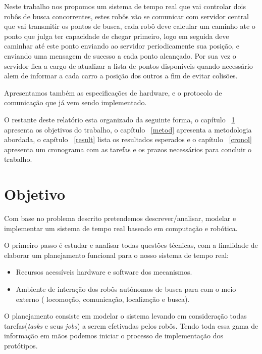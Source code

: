 \documentclass{abnt}
\begin{document}
    Neste trabalho nos propomos um sistema de tempo real que vai controlar
    dois robôs de busca concorrentes, estes robôs vão se comunicar com servidor
    central que vai transmitir os pontos de busca, cada robô deve calcular um
    caminho ate o ponto que julga ter capacidade de chegar primeiro, logo em
    seguida deve caminhar até este ponto enviando ao servidor periodicamente
    sua posição, e enviando uma mensagem de sucesso a cada ponto alcançado. Por
    sua vez o servidor fica a cargo de atualizar a lista de pontos disponíveis
    quando necessário alem de informar a cada carro a posição dos outros a fim
    de evitar colisões.

    Apresentamos também  as especificações de hardware, e o protocolo
    de comunicação que já vem sendo implementado.
     
    O restante deste relatório esta organizado da seguinte forma, o capítulo
    ~\ref{objt} apresenta os objetivos do trabalho, o capítulo ~\ref{metod}
    apresenta a metodologia abordada, o capítulo ~\ref{result} lista os
    resultados esperados e o capítulo ~\ref{cronol} apresenta um cronograma com
    as tarefas e os prazos necessários para concluir o trabalho.

\chapter{Objetivo} \label{objt}

Com base no problema descrito pretendemos descrever/analisar, modelar e
implementar  um sistema de tempo real baseado em computação e robótica. 

O primeiro passo é estudar e analisar todas questões técnicas, com a finalidade
de elaborar um planejamento funcional para o nosso sistema de tempo real:
\begin{itemize}

    \item Recursos acessíveis hardware e software dos mecanismos.
    \item Ambiente de interação dos robôs autônomos de busca para com o meio externo (
locomoção, comunicação, localização e busca).

\end{itemize}

O planejamento consiste em modelar o sistema levando em consideração todas
tarefas(\textit{tasks} e seus \textit{jobs}) a serem efetivadas pelos robôs. Tendo toda essa
gama de informação em mãos podemos iniciar o processo de implementação dos
protótipos.
\end{document}
